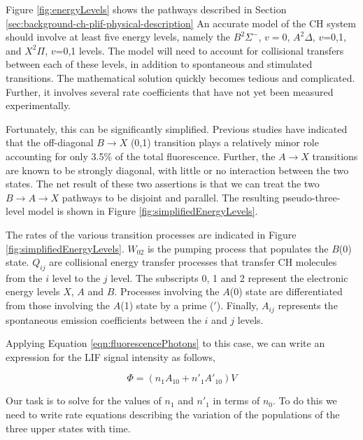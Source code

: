 

Figure \ref{fig:energyLevels} shows the pathways described in Section \ref{sec:background-ch-plif-physical-description}
An accurate model of the CH system should involve at least five energy levels, namely the \(B^2\Sigma^-\), \(v=0\), \(A^2\Delta\), \(v\)=0,1, and \(X^2\Pi\), \(v\)=0,1 levels.
The model will need to account for collisional transfers between each of these levels, in addition to spontaneous and stimulated transitions.
The mathematical solution quickly becomes tedious and complicated.
Further, it involves several rate coefficients that have not yet been measured experimentally.

Fortunately, this can be significantly simplified.
Previous studies\cite{1996-luque-c,2000-luque} have indicated that the off-diagonal \(B\rightarrow X\) (0,1) transition plays a relatively minor role accounting for only 3.5\% of the total fluorescence.
Further, the \(A\rightarrow X\) transitions are known\cite{1996-luque-b} to be strongly diagonal, with little or no interaction\cite{1985-garland-b} between the two states.
The net result of these two assertions is that we can treat the two \(B\rightarrow A\rightarrow X\) pathways to be disjoint and parallel.
The resulting pseudo-three-level model is shown in Figure \ref{fig:simplifiedEnergyLevels}.



The rates of the various transition processes are indicated in Figure \ref{fig:simplifiedEnergyLevels}.
\(W_{02}\) is the pumping process that populates the \(B\)(0) state.
\(Q_{ij}\) are collisional energy transfer processes that transfer CH molecules from the \(i\) level to the \(j\) level.
The subscripts 0, 1 and 2 represent the electronic energy levels \(X\), \(A\) and \(B\).
Processes involving the \(A\)(0) state are differentiated from those involving the \(A\)(1) state by a prime (\('\)).
Finally, \(A_{ij}\) represents the spontaneous emission coefficients between the \(i\) and \(j\) levels.

Applying Equation \ref{eqn:fluorescencePhotons} to this case, we can write an expression for the LIF signal intensity as follows,

\begin{equation}
  \Phi = ( n_1 A_{10} + n'_1 A'_{10} )V
  \label{eqn:signalIntensity}
\end{equation}

Our task is to solve for the values of \(n_1\) and \(n'_1\) in terms of \(n_0\).
To do this we need to write rate equations describing the variation of the populations of the three upper states with time.


